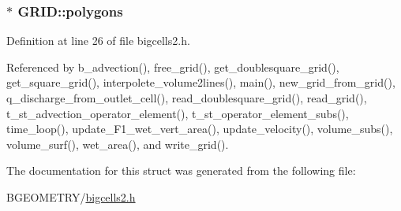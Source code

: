 \hypertarget{struct_g_r_i_d_a91320dc03eda3245c1097ff5e89612c2}{
\subsubsection[{polygons}]{$\ast$ G\-R\-I\-D\-::polygons}}\label{struct_g_r_i_d_a91320dc03eda3245c1097ff5e89612c2}


Definition at line 26 of file bigcells2.\-h.



Referenced by b\-\_\-advection(), free\-\_\-grid(), get\-\_\-doublesquare\-\_\-grid(), get\-\_\-square\-\_\-grid(), interpolete\-\_\-volume2lines(), main(), new\-\_\-grid\-\_\-from\-\_\-grid(), q\-\_\-discharge\-\_\-from\-\_\-outlet\-\_\-cell(), read\-\_\-doublesquare\-\_\-grid(), read\-\_\-grid(), t\-\_\-st\-\_\-advection\-\_\-operator\-\_\-element(), t\-\_\-st\-\_\-operator\-\_\-element\-\_\-subs(), time\-\_\-loop(), update\-\_\-\-F1\-\_\-wet\-\_\-vert\-\_\-area(), update\-\_\-velocity(), volume\-\_\-subs(), volume\-\_\-surf(), wet\-\_\-area(), and write\-\_\-grid().



The documentation for this struct was generated from the following file\-:\begin{DoxyCompactItemize}
\item 
B\-G\-E\-O\-M\-E\-T\-R\-Y/\hyperlink{bigcells2_8h}{bigcells2.\-h}\end{DoxyCompactItemize}
